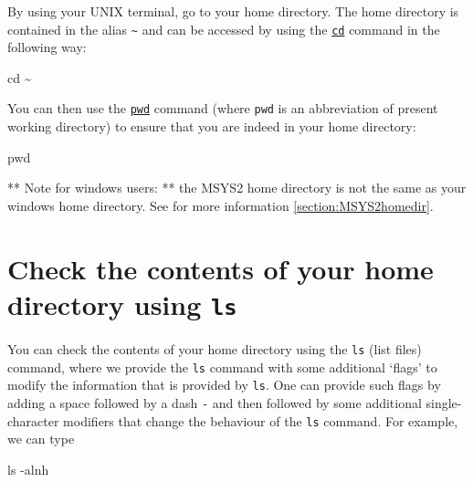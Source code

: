 \documentclass[
]{book}
\newenvironment{Shaded}{\begin{snugshade}}{\end{snugshade}}
\newcommand{\AttributeTok}[1]{\textcolor[rgb]{0.77,0.63,0.00}{#1}}
\newcommand{\BuiltInTok}[1]{#1}
\newcommand{\FunctionTok}[1]{\textcolor[rgb]{0.00,0.00,0.00}{#1}}
\newcommand{\NormalTok}[1]{#1}
\begin{document}
By using your UNIX terminal, go to your home directory. The home directory is contained in the alias \texttt{\textasciitilde{}} and can be accessed by using the \href{https://www.tutorialspoint.com/unix_commands/cd.htm}{\texttt{cd}} command in the following way:

\begin{Shaded}
\begin{Highlighting}[]
\BuiltInTok{cd}\NormalTok{ \textasciitilde{}}
\end{Highlighting}
\end{Shaded}

You can then use the \href{https://phoenixnap.com/kb/pwd-linux}{\texttt{pwd}} command (where \texttt{pwd} is an abbreviation of present working directory) to ensure that you are indeed in your home directory:

\begin{Shaded}
\begin{Highlighting}[]
\BuiltInTok{pwd}
\end{Highlighting}
\end{Shaded}

** Note for windows users: ** the MSYS2 home directory is not the same as your windows home directory. See for more information \ref{section:MSYS2homedir}.

\hypertarget{check-the-contents-of-your-home-directory-using-ls}{%
\section{\texorpdfstring{Check the contents of your home directory using \texttt{ls}}{Check the contents of your home directory using ls}}\label{check-the-contents-of-your-home-directory-using-ls}}

You can check the contents of your home directory using the \texttt{ls} (list files) command, where we provide the \texttt{ls} command with some additional `flags' to modify the information that is provided by \texttt{ls}. One can provide such flags by adding a space followed by a dash \texttt{-} and then followed by some additional single-character modifiers that change the behaviour of the \texttt{ls} command. For example, we can type

\begin{Shaded}
\begin{Highlighting}[]
\FunctionTok{ls} \AttributeTok{{-}alnh}
\end{Highlighting}
\end{Shaded}
\end{document}
